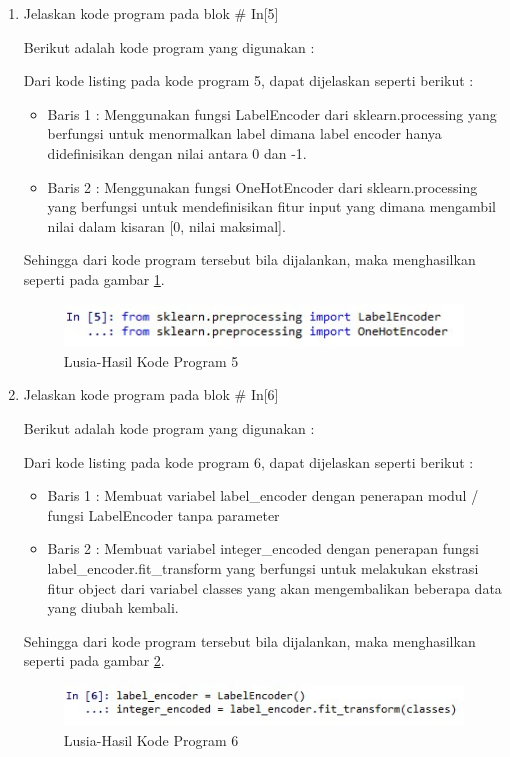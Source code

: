 \begin{enumerate}
\item Jelaskan kode program pada blok \# In[5]
	\par Berikut adalah kode program yang digunakan :
	
	\par Dari kode listing pada kode program 5, dapat dijelaskan seperti berikut :
	\begin{itemize}
	\item Baris 1	: Menggunakan fungsi LabelEncoder dari sklearn.processing yang berfungsi untuk menormalkan label dimana label encoder hanya didefinisikan dengan nilai antara 0 dan -1.
	\item Baris 2	: Menggunakan fungsi OneHotEncoder dari sklearn.processing yang berfungsi untuk mendefinisikan fitur input yang dimana mengambil nilai dalam kisaran [0, nilai maksimal].
	\end{itemize}
	\par Sehingga dari kode program tersebut bila dijalankan, maka menghasilkan seperti pada gambar \ref{7B5}.
		\begin{figure}[!hbtp]
		\centering
		\includegraphics[scale=0.5]{figures/w5.jpg}
		\caption{Lusia-Hasil Kode Program 5}
		\label{7B5}
		\end{figure}
	
\item Jelaskan kode program pada blok \# In[6]
	\par Berikut adalah kode program yang digunakan :
	
	\par Dari kode listing pada kode program 6, dapat dijelaskan seperti berikut :
	\begin{itemize}
	\item Baris 1	: Membuat variabel label\_encoder dengan penerapan modul / fungsi LabelEncoder tanpa parameter
	\item Baris 2	: Membuat variabel integer\_encoded dengan penerapan fungsi label\_encoder.fit\_transform yang berfungsi untuk melakukan ekstrasi fitur object dari variabel classes yang akan mengembalikan beberapa data yang diubah kembali.
	\end{itemize}
	\par Sehingga dari kode program tersebut bila dijalankan, maka menghasilkan seperti pada gambar \ref{7B6}.
		\begin{figure}[!hbtp]
		\centering
		\includegraphics[scale=0.5]{figures/w6.jpg}
		\caption{Lusia-Hasil Kode Program 6}
		\label{7B6}
		\end{figure}

\end{enumerate}

